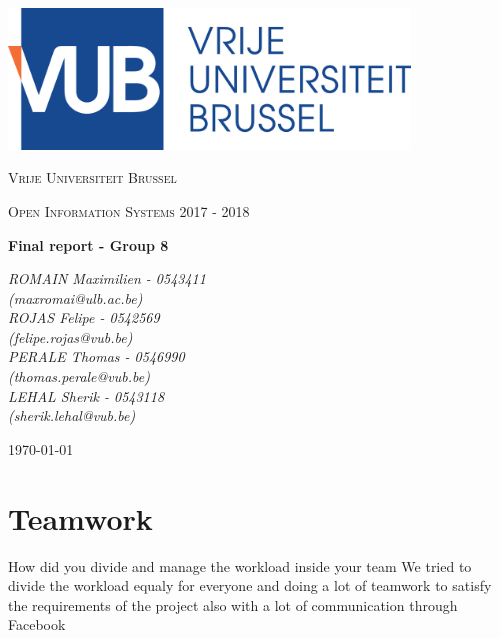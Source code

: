 \documentclass[a4paper,12pt]{article}
\begin{document}
\begin{titlepage}
	\centering
	\includegraphics[width=0.8\textwidth]{logo.eps}\par\vspace{1cm}
	{\scshape\LARGE Vrije Universiteit Brussel\par}
	\vspace{1cm}
	{\scshape\Large Open Information Systems 2017 - 2018\par}
	\vspace{1.5cm}
	{\huge\bfseries Final report - Group 8\par}
	\vspace{2cm}
	{\Large\itshape ROMAIN Maximilien - 0543411\\ (maxromai@ulb.ac.be)\\ ROJAS Felipe - 0542569\\ (felipe.rojas@vub.be)\\PERALE Thomas - 0546990\\ (thomas.perale@vub.be)\\ LEHAL Sherik - 0543118\\ (sherik.lehal@vub.be)\par}
	\vfill

	{\large \today\par}
\end{titlepage}

\newpage


\section{Teamwork}
How did you divide and manage the workload inside your team
We tried to divide the workload equaly for everyone and doing a lot of teamwork to satisfy the requirements of the project also with a lot of communication through Facebook
\end{document}
